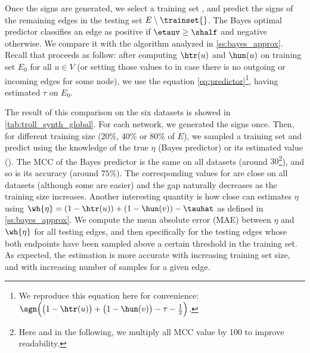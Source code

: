 Once the signs are generated, we select a training set \trainset{} \uar{}, and predict
the signs of the remaining edges in the testing set $E\setminus \trainset{}$. The Bayes optimal
predictor classifies an edge \euv{} as positive if $\etauv \geq \shalf$ and negative otherwise. 
We compare it with the \usrule{} algorithm analyzed in \autoref{ss:bayes_approx}. Recall that
\usrule{} proceeds as follow: after computing $\htr(u)$ and $\hun(u)$ on training set $E_0$ for all
$u \in V$ (or setting those values to \shalf{} in case there is no outgoing or incoming edges for
some node), we use the equation \eqref{eq:predictor}\footnote{We reproduce this equation here for
convenience: $\sgn\Big(\big(1-\htr(u)\big) + \big(1-\hun(v)\big) -\tau - \tfrac{1}{2}\Big)$.},
having estimated $\tau$ on $E_0$.


The result of this comparison on the six datasets is showed in \autoref{tab:troll_synth_global}.
For each network, we generated the signs once. Then, for different training size (20\%, 40\% or 80\%
of $E$), we sampled a training set and predict using the knowledge of the true $\eta$ (Bayes
predictor) or its estimated value (\usrule{}).
The MCC of the Bayes predictor is the same on all datasets (around $30$\footnote{Here and in the
following, we multiply all MCC value by 100 to improve readability.}), and so is its accuracy
(around $75\%$). The corresponding values for \usrule{} are close on all datasets (although some are
easier) and the gap naturally decreases as the training size increases. Another interesting
quantity is how close can \usrule{} estimates $\eta$ using $\wh{\eta} = \left(1-\htr(u)\right) +
\left(1-\hun(v)\right) -\tauhat$ as defined in \autoref{ss:bayes_approx}. We compute the mean
absolute error (MAE) between $\eta$ and $\wh{\eta}$ for all testing edges, and then specifically for
the testing edges whose both endpoints have been sampled above a certain threshold in the training
set. As expected, the estimation is more accurate with increasing training set size, and with
increasing number of samples for a given edge.

